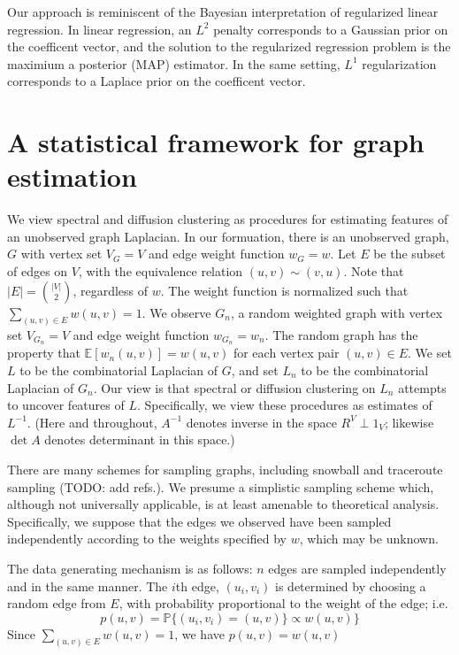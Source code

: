 \documentclass{article}
\newcommand{\prob}{\mathbb{P}}
\newcommand{\E}{\mathbb{E}}
\begin{document}
Our approach is reminiscent of the Bayesian interpretation of
regularized linear regression.  In linear regression, an $L^2$ penalty
corresponds to a Gaussian prior on the coefficent vector, and the
solution to the regularized regression problem is the maximium a
posterior (MAP) estimator.  In the same setting, $L^1$ regularization
corresponds to a Laplace prior on the coefficent vector.


\section{A statistical framework for graph estimation}

We view spectral and diffusion clustering as procedures for estimating
features of an unobserved graph Laplacian.  In our formuation, there
is an unobserved graph, $G$ with vertex set $V_G = V$ and edge weight
function $w_G = w$.  Let $E$ be the subset of edges on $V$, with the
equivalence relation $(u,v) \sim (v,u)$.  Note that $|E| =
\binom{|V|}{2}$, regardless of $w$.  The weight function is normalized such that
$\sum_{(u,v) \in E} w(u,v) = 1$.  We observe $G_n$, a random weighted graph with
vertex set $V_{G_n} = V$ and edge weight function $w_{G_n} = w_n$.
The random graph has the property that $\E[w_n(u,v)] = w(u,v)$ for
each vertex pair $(u,v) \in E$.  We set $L$ to be the combinatorial
Laplacian of $G$, and set $L_n$ to be the combinatorial Laplacian of
$G_n$.  Our view is that spectral or diffusion clustering on $L_n$
attempts to uncover features of $L$.  Specifically, we view these
procedures as estimates of $L^{-1}$.  (Here and throughout, $A^{-1}$
denotes inverse in the space $R^V \perp 1_V$; likewise $\det A$
denotes determinant in this space.)

There are many schemes for sampling graphs, including snowball and
traceroute sampling (TODO: add refs.). We presume a simplistic
sampling scheme which, although not universally applicable, is at
least amenable to theoretical analysis.  Specifically, we suppose that
the edges we observed have been sampled independently according to the
weights specified by $w$, which may be unknown.

The data generating mechanism is as follows: $n$ edges are sampled
independently and in the same manner.  The $i$th edge, $(u_i, v_i)$ is determined by
choosing a random edge from $E$, with probability proportional to the
weight of the edge; i.e.
\[
p(u,v) = \prob\{ (u_i,v_i) = (u,v) \} \propto w(u,v) \}
\]
Since $\sum_{(u,v) \in E} w(u,v) = 1$, we have
\(
  p(u,v) = w(u,v)
\)
\end{document}
